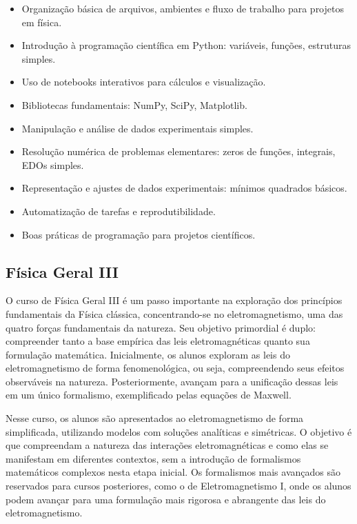 \documentclass[a4paper, 12pt]{article}
\newcounter{fis}
\newcounter{mat}
\begin{document}
\begin{tcolorbox}[title=Ementa:]
    \begin{itemize}
        \item Organização básica de arquivos, ambientes e fluxo de trabalho para projetos em física.
        \item Introdução à programação científica em Python: variáveis, funções, estruturas simples.
        \item Uso de notebooks interativos para cálculos e visualização.
        \item Bibliotecas fundamentais: NumPy, SciPy, Matplotlib.
        \item Manipulação e análise de dados experimentais simples.
        \item Resolução numérica de problemas elementares: zeros de funções, integrais, EDOs simples.
        \item Representação e ajustes de dados experimentais: mínimos quadrados básicos.
        \item Automatização de tarefas e reprodutibilidade.
        \item Boas práticas de programação para projetos científicos.
    \end{itemize}
\end{tcolorbox}

\subsection{Física Geral III}
\label{fis008}

O curso de Física Geral III é um passo importante na exploração dos princípios
fundamentais da Física clássica, concentrando-se no eletromagnetismo, uma das quatro
forças fundamentais da natureza. Seu objetivo primordial é duplo: compreender tanto a
base empírica das leis eletromagnéticas quanto sua formulação matemática. Inicialmente,
os alunos exploram as leis do eletromagnetismo de forma fenomenológica, ou seja,
compreendendo seus efeitos observáveis na natureza. Posteriormente, avançam para a
unificação dessas leis em um único formalismo, exemplificado pelas equações de Maxwell.

Nesse curso, os alunos são apresentados ao eletromagnetismo de forma simplificada,
utilizando modelos com soluções analíticas e simétricas. O objetivo é que compreendam a
natureza das interações eletromagnéticas e como elas se manifestam em diferentes
contextos, sem a introdução de formalismos matemáticos complexos nesta etapa inicial.
Os formalismos mais avançados são reservados para cursos posteriores, como o de
Eletromagnetismo I, onde os alunos podem avançar para uma formulação mais rigorosa e
abrangente das leis do eletromagnetismo.
\end{document}
